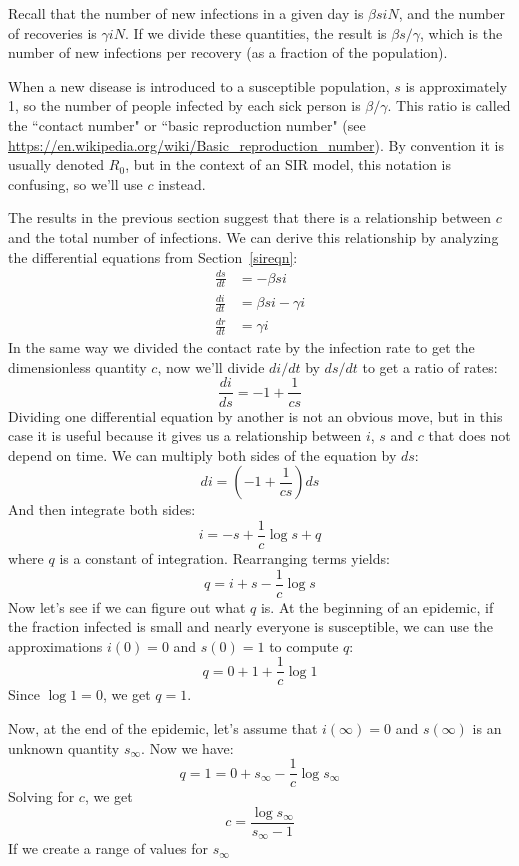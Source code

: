 \documentclass[12pt]{book}
\theoremstyle{exercise}
\begin{document}
Recall that the number of new infections in a given day is $\beta s i N$, and the number of recoveries is $\gamma i N$.  If we divide these quantities, the result is $\beta s / \gamma$, which is the number of new infections per recovery (as a fraction of the population).

When a new disease is introduced to a susceptible population, $s$ is approximately 1, so the number of people infected by each sick person is $\beta / \gamma$.  This ratio is called the ``contact number" or ``basic reproduction number" (see \url{https://en.wikipedia.org/wiki/Basic_reproduction_number}).  By convention it is usually denoted $R_0$, but in the context of an SIR model, this notation is confusing, so we'll use $c$ instead.

The results in the previous section suggest that there is a relationship between $c$ and the total number of infections.  We can derive this relationship by analyzing the differential equations from Section~\ref{sireqn}:
%
\begin{align*}
\frac{ds}{dt} &= -\beta s i \\
\frac{di}{dt} &= \beta s i - \gamma i\\
\frac{dr}{dt} &= \gamma i
\end{align*}
%
In the same way we divided the contact rate by the infection rate to get the dimensionless quantity $c$, now we'll divide $di/dt$ by $ds/dt$ to get a ratio of rates:
%
\[ \frac{di}{ds} = -1 + \frac{1}{cs} \]
%
Dividing one differential equation by another is not an obvious move, but in this case it is useful because it gives us a relationship between $i$, $s$ and $c$ that does not depend on time.  We can multiply both sides of the equation by $ds$:
%
\[ di = \left( -1 + \frac{1}{cs} \right) ds \]
%
And then integrate both sides:
%
\[ i = -s + \frac{1}{c} \log s + q \]
%
where $q$ is a constant of integration.  Rearranging terms yields:
%
\[ q = i + s - \frac{1}{c} \log s \]
%
Now let's see if we can figure out what $q$ is.  At the beginning of an epidemic, if the fraction infected is small and nearly everyone is susceptible, we can use the approximations $i(0) = 0$ and $s(0) = 1$ to compute $q$:
%
\[ q = 0 + 1 + \frac{1}{c} \log 1 \]
%
Since $\log 1 = 0$, we get $q = 1$.

\newcommand{\sinf}{s_{\infty}}

Now, at the end of the epidemic, let's assume that $i(\infty) = 0$ and $s(\infty)$ is an unknown quantity $\sinf$.  Now we have:
%
\[ q = 1 = 0 + \sinf - \frac{1}{c} \log \sinf \]
%
Solving for $c$, we get
%
\[ c = \frac{\log \sinf}{\sinf - 1} \]
%
If we create a range of values for $\sinf$
\end{document}
